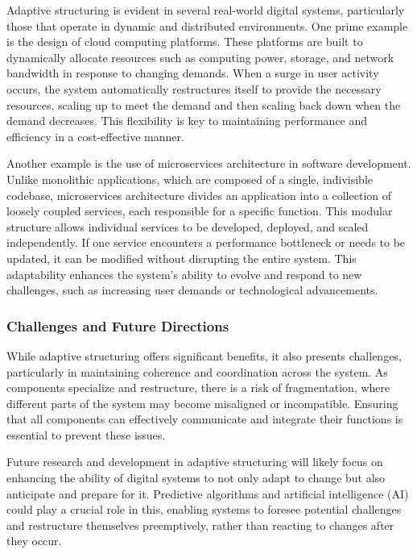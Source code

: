 \documentclass[12pt,twoside]{article}
\begin{document}
Adaptive structuring is evident in several real-world digital systems, particularly those that operate in dynamic and distributed environments. One prime example is the design of cloud computing platforms. These platforms are built to dynamically allocate resources such as computing power, storage, and network bandwidth in response to changing demands. When a surge in user activity occurs, the system automatically restructures itself to provide the necessary resources, scaling up to meet the demand and then scaling back down when the demand decreases. This flexibility is key to maintaining performance and efficiency in a cost-effective manner.

Another example is the use of microservices architecture in software development. Unlike monolithic applications, which are composed of a single, indivisible codebase, microservices architecture divides an application into a collection of loosely coupled services, each responsible for a specific function. This modular structure allows individual services to be developed, deployed, and scaled independently. If one service encounters a performance bottleneck or needs to be updated, it can be modified without disrupting the entire system. This adaptability enhances the system’s ability to evolve and respond to new challenges, such as increasing user demands or technological advancements.

\subsubsection{Challenges and Future Directions}

While adaptive structuring offers significant benefits, it also presents challenges, particularly in maintaining coherence and coordination across the system. As components specialize and restructure, there is a risk of fragmentation, where different parts of the system may become misaligned or incompatible. Ensuring that all components can effectively communicate and integrate their functions is essential to prevent these issues.

Future research and development in adaptive structuring will likely focus on enhancing the ability of digital systems to not only adapt to change but also anticipate and prepare for it. Predictive algorithms and artificial intelligence (AI) could play a crucial role in this, enabling systems to foresee potential challenges and restructure themselves preemptively, rather than reacting to changes after they occur.
\end{document}
